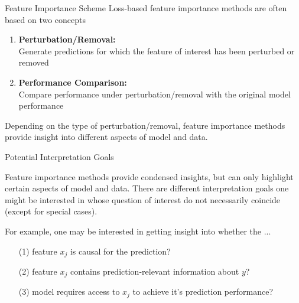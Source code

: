 \documentclass[11pt,compress,t,notes=noshow, aspectratio=169, xcolor=table]{beamer}
\begin{document}
\begin{frame}{Feature Importance Scheme}
Loss-based feature importance methods are often based on two concepts
\lz
\begin{enumerate}
  \item \textbf{Perturbation/Removal:}\\
  Generate predictions for which the feature of interest has been perturbed or removed
  \item \textbf{Performance Comparison:} \\
  Compare performance under perturbation/removal with the original model performance
\end{enumerate}
\lz
Depending on the type of perturbation/removal, feature importance methods provide insight into different aspects of model and data.
\end{frame}


\begin{frame}{Potential Interpretation Goals}

Feature importance methods provide condensed insights, but can only highlight certain aspects of model and data. There are different interpretation goals one might be interested in whose question of interest do not necessarily coincide (except for special cases).

\lz

For example, one may be interested in getting insight into whether the ...

\begin{enumerate}
    \item[(1)] feature $x_j$ is causal for the prediction?
    \item[(2)] feature $x_j$ contains prediction-relevant information about $y$?
    \item[(3)] model requires access to $x_j$ to achieve it's prediction performance?
\end{enumerate}
\end{frame}
\end{document}
